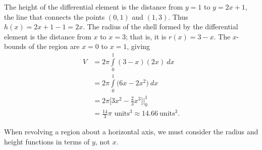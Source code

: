 \begin{example}
The height of the differential element is the distance from $y=1$ to $y=2x+1$, the line that connects the points $(0,1)$ and $(1,3)$. Thus $h(x) = 2x+1-1 = 2x$. The radius of the shell formed by the differential element is the distance from $x$ to $x=3$; that is, it is $r(x)=3-x$. The $x$-bounds of the region are $x=0$ to $x=1$, giving
\allowdisplaybreaks
\begin{align*}
V &=	2\pi\int\limits_0^1 (3-x)(2x)\ dx \\[0.2cm]
	&= 2\pi\int\limits_0^1 \big(6x-2x^2\big)\ dx \\[0.2cm]
	&= 2\pi \Big[3x^2-\frac23x^3 \Big]\Big|_0^1\\
	&= \frac{14}{3}\pi \text{ units}^3\approx 14.66\ \text{units}^3.
\end{align*}




\end{example}

When revolving a region about a horizontal axis, we must consider the radius and height functions in terms of $y$, not $x$.\\

